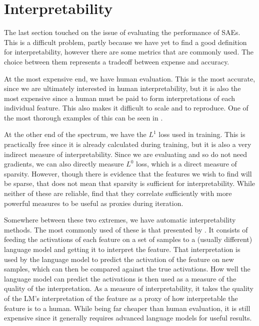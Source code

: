 
\section{Interpretability}
The last section touched on the issue of evaluating the performance of SAEs.
This is a difficult problem, partly because we have yet to find a good definition for interpretability, however there are some metrics that are commonly used.
The choice between them represents a tradeoff between expense and accuracy.

At the most expensive end, we have human evaluation.
This is the most accurate, since we are ultimately interested in human interpretability, but it is also the most expensive since a human must be paid to form interpretations of each individual feature.
This also makes it difficult to scale and to reproduce.
One of the most thorough examples of this can be seen in \cite{bricken_towards_2023}.

At the other end of the spectrum, we have the $L^1$ loss used in training.
This is practically free since it is already calculated during training, but it is also a very indirect measure of interpretability.
Since we are evaluating and so do not need gradients, we can also directly measure $L^0$ loss, which is a direct measure of sparsity.
However, though there is evidence that the features we wish to find will be sparse, that does not mean that sparsity is sufficient for interpretability.
While neither of these are reliable, \cite{bricken_towards_2023} find that they correlate sufficiently with more powerful measures to be useful as proxies during iteration.

Somewhere between these two extremes, we have automatic interpretability methods.
The most commonly used of these is that presented by \cite{bills_language_2023}.
It consists of feeding the activations of each feature on a set of samples to a (usually different) language model and getting it to interpret the feature.
That interpretation is used by the language model to predict the activation of the feature on new samples, which can then be compared against the true activations.
How well the language model can predict the activations is then used as a measure of the quality of the interpretation.
As a measure of interpretability, it takes the quality of the LM's interpretation of the feature as a proxy of how interpretable the feature is to a human.
While being far cheaper than human evaluation, it is still expensive since it generally requires advanced language models for useful results.

